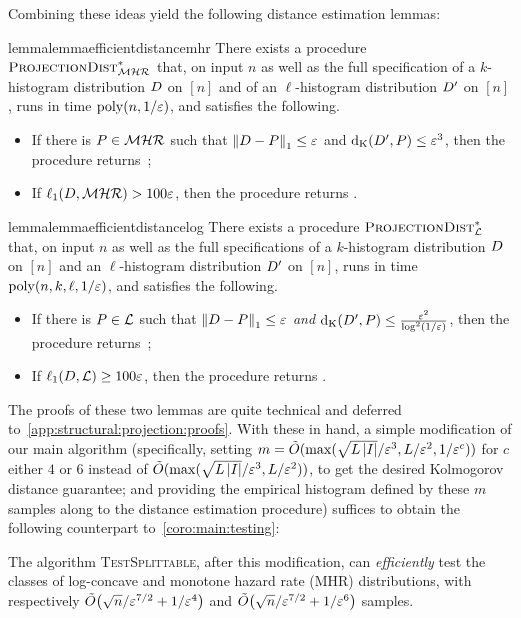 \noindent Combining these ideas yield the following distance estimation lemmas:
\begin{restatable}{lemma}{lemmaefficientdistancemhr}\label{lemma:distance:mhr:eff}
  There exists a procedure $\estimdist[\classmhr]^\ast$ that, on input $n$ as well as the full specification of a $k$-histogram distribution $\D$ on $[n]$ and of an $\ell$-histogram distribution $\D^{\prime}$ on $[n]$, runs in time $\poly(n,1/\eps)$, and satisfies the following.
  \begin{itemize}
    \item If there is $P\in\classmhr$ such that $\normone{\D-P} \leq \eps$  and $\kolmogorov{\D^\prime}{P} \leq \eps^3$, then the procedure returns~\yes;
    \item If $\lp[1](\D,\classmhr) > 100\eps$, then the procedure returns \no.
  \end{itemize}
\end{restatable}

\begin{restatable}{lemma}{lemmaefficientdistancelog}\label{lemma:distance:log:eff}
  There exists a procedure $\estimdist[\classlog]^\ast$ that, on input $n$ as well as the full specifications of a $k$-histogram distribution $\D$ on $[n]$ and an $\ell$-histogram distribution $\D^\prime$ on $[n]$, runs in time $\poly(n,k,\ell,1/\eps)$, and satisfies the following.
  \begin{itemize}
    \item If there is $P\in\classlog$ such that $\normone{\D-P}\leq \eps$ \emph{and} $\kolmogorov{\D^\prime}{P}\leq \frac{\eps^2}{\log^2(1/\eps)}$, then the procedure returns~\yes;
    \item If $\lp[1](\D,\classlog) \geq 100\eps$, then the procedure returns \no.
  \end{itemize}
\end{restatable}

The proofs of these two lemmas are quite technical and deferred to~\cref{app:structural:projection:proofs}. With these in hand, a simple modification of our main algorithm (specifically, setting $m = \tilde{O}( \max({\sqrt{L\abs{I}}}/{\eps^3}, {L}/{\eps^2}, {1}/{\eps^c} ) )$ for $c$ either $4$ or $6$ instead of $\tilde{O}( \max ( {\sqrt{L\abs{I}}}/{\eps^3}, {L}/{\eps^2} ) )$, to get the desired Kolmogorov distance guarantee; and providing the empirical histogram defined by these $m$ samples along to the distance estimation procedure) suffices to obtain the following counterpart to~\cref{coro:main:testing}:
\begin{corollary}\label{coro:main:testing:eff}
The algorithm \textsc{TestSplittable}, after this modification, can \emph{efficiently} test the classes of log-concave and monotone hazard rate (MHR) distributions, with respectively $\tilde{O}\big({\sqrt{n}/\eps^{7/2} + 1/\eps^4}\big)$ and $\tilde{O}\big({\sqrt{n}/\eps^{7/2} + 1/\eps^6}\big)$ samples.
\end{corollary}

